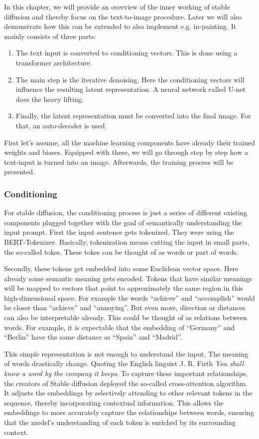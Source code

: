 \documentclass[11pt]{article}
\begin{document}
In this chapter, we will provide an overview of the inner working of stable diffusion and thereby focus on the text-to-image procedure. Later we will also demonstrate how this can be extended to also implement e.g. in-painting. It mainly consists of three parts:
\begin{enumerate}
    \item The text input is converted to conditioning vectors. This is done using a transformer architecture.
    \item The main step is the iterative denoising. Here the conditioning vectors will influence the resulting latent representation. A neural network called U-net does the heavy lifting.
    \item Finally, the latent representation must be converted into the final image. For that, an auto-decoder is used. 
\end{enumerate}

First let's assume, all the machine learning components have already their trained weights and biases. Equipped with these, we will go through step by step how a text-input is turned into an image. Afterwards, the training process will be presented.

\subsubsection{Conditioning}
For stable diffusion, the conditioning process is just a series of different existing components plugged together with the goal of semantically understanding the input prompt. First the input sentence gets tokenized. They were using the BERT-Tokenizer\cite{devlin2019bert}. Basically, tokenization means cutting the input in small parts, the so-called tokes. These tokes can be thought of as words or part of words. 

Secondly, these tokens get embedded into some Euclidean vector space. Here already some semantic meaning gets encoded. Tokens that have similar meanings will be mapped to vectors that point to approximately the same region in this high-dimensional space. For example the words “achieve” and “accomplish” would be closer than “achieve” and “annoying”. But even more, direction or distances can also be interpretable already. This could be thought of as relations between words. For example, it is expectable that the embedding of “Germany” and “Berlin” have the same distance as “Spain” and “Madrid”. 

This simple representation is not enough to understand the input. The meaning of words drastically change. Quoting the English linguist J. R. Firth \textit{You shall know a word by the company it keeps}\cite{firth1962studiesinlinguisticanalysis}. To capture these important relationships, the creators of Stable diffusion deployed the so-called cross-attention algorithm\cite{vaswani2023attentionneed}. It adjusts the embeddings by selectively attending to other relevant tokens in the sequence, thereby incorporating contextual information. This allows the embeddings to more accurately capture the relationships between words, ensuring that the model's understanding of each token is enriched by its surrounding context.
\end{document}
